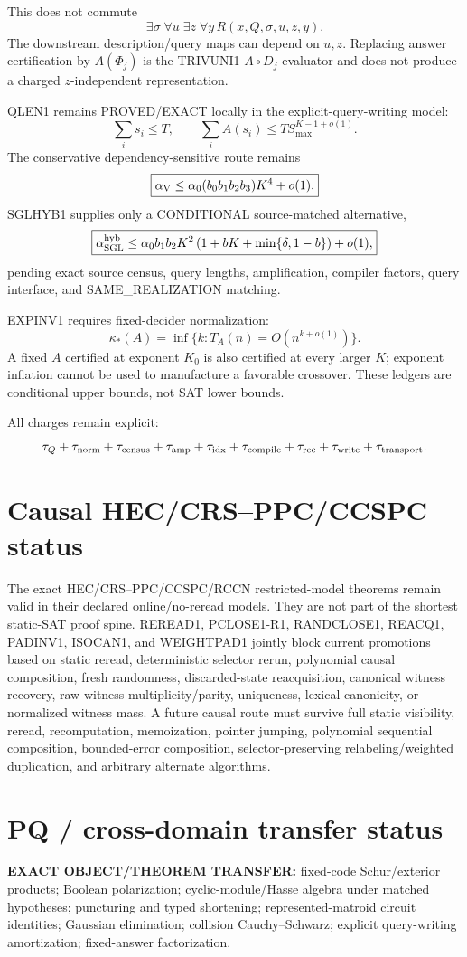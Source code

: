 \documentclass[11pt]{article}
\begin{document}
This does not commute
\[
\boxed{\exists\sigma\;\forall u\;\exists z\;\forall y\,R(x,Q,\sigma,u,z,y).}
\]
The downstream description/query maps can depend on \(u,z\). Replacing answer certification by \(A(\Phi_j)\) is the TRIVUNI1 \(A\circ D_j\) evaluator and does not produce a charged \(z\)-independent representation.

QLEN1 remains PROVED/EXACT locally in the explicit-query-writing model:
\[
\sum_i s_i\le T,\qquad
\boxed{\sum_i A(s_i)\le T S_{\max}^{K-1+o(1)}}.
\]
The conservative dependency-sensitive route remains
\[
\boxed{\alpha_{\rm V}\le
\alpha_0(b_0b_1b_2b_3)K^4+o(1).}
\]
SGLHYB1 supplies only a CONDITIONAL source-matched alternative,
\[
\boxed{\alpha_{\rm SGL}^{\rm hyb}\le
\alpha_0b_1b_2K^2
\left(1+bK+\min\{\delta,1-b\}\right)+o(1),}
\]
pending exact source census, query lengths, amplification, compiler factors, query interface, and SAME\_REALIZATION matching.

EXPINV1 requires fixed-decider normalization:
\[
\boxed{\kappa_*(A)=\inf\{k:T_A(n)=O(n^{k+o(1)})\}.}
\]
A fixed \(A\) certified at exponent \(K_0\) is also certified at every larger \(K\); exponent inflation cannot be used to manufacture a favorable crossover. These ledgers are conditional upper bounds, not SAT lower bounds.

All charges remain explicit:
\[
\tau_Q+\tau_{\rm norm}+\tau_{\rm census}+\tau_{\rm amp}
+\tau_{\rm idx}+\tau_{\rm compile}+\tau_{\rm rec}
+\tau_{\rm write}+\tau_{\rm transport}.
\]

\section*{Causal HEC/CRS--PPC/CCSPC status}
The exact HEC/CRS--PPC/CCSPC/RCCN restricted-model theorems remain valid in their declared online/no-reread models. They are not part of the shortest static-SAT proof spine. REREAD1, PCLOSE1-R1, RANDCLOSE1, REACQ1, PADINV1, ISOCAN1, and WEIGHTPAD1 jointly block current promotions based on static reread, deterministic selector rerun, polynomial causal composition, fresh randomness, discarded-state reacquisition, canonical witness recovery, raw witness multiplicity/parity, uniqueness, lexical canonicity, or normalized witness mass. A future causal route must survive full static visibility, reread, recomputation, memoization, pointer jumping, polynomial sequential composition, bounded-error composition, selector-preserving relabeling/weighted duplication, and arbitrary alternate algorithms.

\section*{PQ / cross-domain transfer status}
\textbf{EXACT OBJECT/THEOREM TRANSFER:} fixed-code Schur/exterior products; Boolean polarization; cyclic-module/Hasse algebra under matched hypotheses; puncturing and typed shortening; represented-matroid circuit identities; Gaussian elimination; collision Cauchy--Schwarz; explicit query-writing amortization; fixed-answer factorization.
\end{document}
